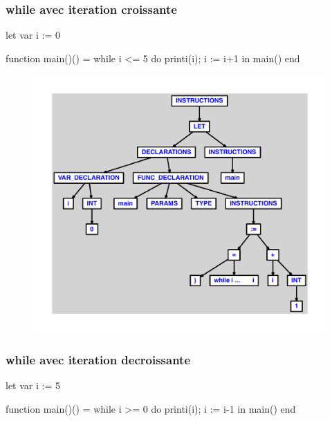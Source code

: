 \documentclass{article}
\begin{document}
\subsubsection{while avec iteration croissante}
\begin{verbatimtab}
let
	var i := 0

	function main()() =
		while i <= 5 do
			printi(i);
			i := i+1
in main() end
\end{verbatimtab}
\begin{figure}[H]\centering\includegraphics[max width=\textwidth]{ast/ast_320.pdf}\end{figure}\subsubsection{while avec iteration decroissante}
\begin{verbatimtab}
let
	var i := 5

	function main()() =
		while i >= 0 do
			printi(i);
			i := i-1
in main() end
\end{verbatimtab}
\end{document}
